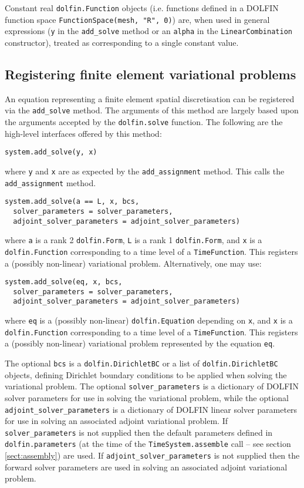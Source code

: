 \documentclass[a4paper]{book}
\begin{document}
Constant real \verb+dolfin.Function+ objects (i.e. functions defined in a
DOLFIN function space \verb+FunctionSpace(mesh, "R", 0)+) are, when used in
general expressions (\verb+y+ in the \verb+add_solve+ method or an \verb+alpha+
in the \verb+LinearCombination+ constructor), treated as corresponding to a
single constant value.

\subsection{Registering finite element variational problems}

An equation representing a finite element spatial discretisation can be
registered via the \verb+add_solve+ method. The arguments of this method are
largely based upon the arguments accepted by the \verb+dolfin.solve+ function.
The following are the high-level interfaces offered by this method:

\begin{lstlisting}
system.add_solve(y, x)
\end{lstlisting}
where \verb+y+ and \verb+x+ are as expected by the \verb+add_assignment+ method.
This calls the \verb+add_assignment+ method.

\begin{lstlisting}
system.add_solve(a == L, x, bcs,
  solver_parameters = solver_parameters,
  adjoint_solver_parameters = adjoint_solver_parameters)
\end{lstlisting}
where \verb+a+ is a rank 2 \verb+dolfin.Form+, \verb+L+ is a rank 1 \linebreak
\verb+dolfin.Form+, and \verb+x+ is a \verb+dolfin.Function+ corresponding to a
time level of a \linebreak \verb+TimeFunction+. This registers a (possibly
non-linear) variational problem. Alternatively, one may use:
\begin{lstlisting}
system.add_solve(eq, x, bcs,
  solver_parameters = solver_parameters,
  adjoint_solver_parameters = adjoint_solver_parameters)
\end{lstlisting}
where \verb+eq+ is a (possibly non-linear) \verb+dolfin.Equation+ depending on
\verb+x+, and \verb+x+ is a \verb+dolfin.Function+ corresponding to a time level
of a \verb+TimeFunction+. This registers a (possibly non-linear) variational
problem represented by the equation \verb+eq+.

The optional \verb+bcs+ is a \verb+dolfin.DirichletBC+ or a list of
\verb+dolfin.DirichletBC+ objects, defining Dirichlet boundary conditions to be
applied when solving the variational problem. The optional
\verb+solver_parameters+ is a dictionary of DOLFIN solver parameters for use in
solving the variational problem, while the optional
\verb+adjoint_solver_parameters+ is a dictionary of DOLFIN linear solver
parameters for use in solving an associated adjoint variational problem. If
\verb+solver_parameters+ is not supplied then the default parameters defined in
\verb+dolfin.parameters+ (at the time of the \verb+TimeSystem.assemble+ call --
see section \ref{sect:assembly}) are used. If \verb+adjoint_solver_parameters+
is not supplied then the forward solver parameters are used in solving an
associated adjoint variational problem.
\end{document}
